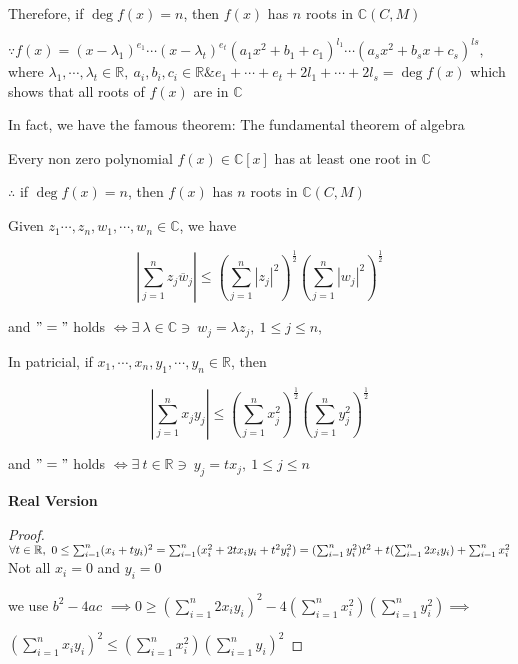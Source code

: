 Therefore, if $\deg f(x) = n$, then $f(x)$ has $n$ roots in $\mathbb C (C,M)$
\begin{tcolorbox}
	$\because f(x) = (x-\lambda_1)^{e_1}\cdots(x-\lambda_t)^{e_t}(a_1x^2+b_1+c_1)^{l_1}\cdots(a_sx^2+b_sx+c_s)^{ls},$ where $\lambda_1,\cdots,\lambda_t \in \mathbb R,~a_i,b_i,c_i \in \mathbb R \& e_1+\cdots+e_t+2l_1+\cdots+2l_s = \deg f(x)$ which shows that all roots of $f(x)$ are in $\mathbb C$
	
	In fact, we have the famous theorem: The fundamental theorem of algebra
	
	Every non zero polynomial $f(x) \in \mathbb C[x]$ has at least one root in $\mathbb C$
	
	$\therefore$ if $\deg f(x) = n$, then $f(x)$ has $n$ roots in $\mathbb C (C,M)$
\end{tcolorbox}

\begin{thm*}
	Given $z_1\cdots,z_n,w_1,\cdots,w_n \in \mathbb C$, we have
	
	$$\left|\sum^n_{j=1}z_j\overline{w}_j\right| \leq \left(\sum^n_{j=1}|z_j|^2\right)^{\frac{1}{2}}\left(\sum^n_{j=1}|w_j|^2\right)^{\frac{1}{2}}$$
	
	and $"="$ holds $\Leftrightarrow \exists~\lambda \in \mathbb C \ni~ w_j = \lambda z_j,~1\leq j \leq n,$
	
	In patricial, if $x_1,\cdots,x_n,y_1,\cdots,y_n \in \mathbb R$, then
	
	$$\left|\sum^n_{j=1}x_jy_j\right| \leq \left( \sum^n_{j=1}x_j^2\right)^\frac{1}{2}\left(\sum^n_{j=1}y_j^2\right)^{\frac{1}{2}}$$
	
	and $"="$ holds $\Leftrightarrow \exists~t \in \mathbb R \ni~ y_j = tx_j,~1\leq j \leq n$
\end{thm*}

\newpage

\textbf{Real Version}

\begin{proof}
	$\forall t \in \mathbb{R},~0 \leq \sum^n_{i=1}(x_i + ty_i)^2 = \sum^n_{i=1}(x_i^2 + 2tx_iy_i + t^2y_i^2) = (\sum^n_{i=1}y_i^2)t^2 + t(\sum^n_{i=1}2x_iy_i) + \sum_{i=1}^nx_i^2$ Not all $x_i = 0$ and $y_i = 0$
	
	we use $b^2 - 4ac$ $\implies 0 \geq (\sum_{i=1}^n2x_iy_i)^2 - 4(\sum_{i=1}^{n}x_i^2)(\sum_{i=1}^ny_i^2) \implies$
	
	$(\sum^n_{i=1}x_iy_i)^2 \leq (\sum^n_{i=1}x_i^2)(\sum^n_{i=1}y_i)^2$
\end{proof}

